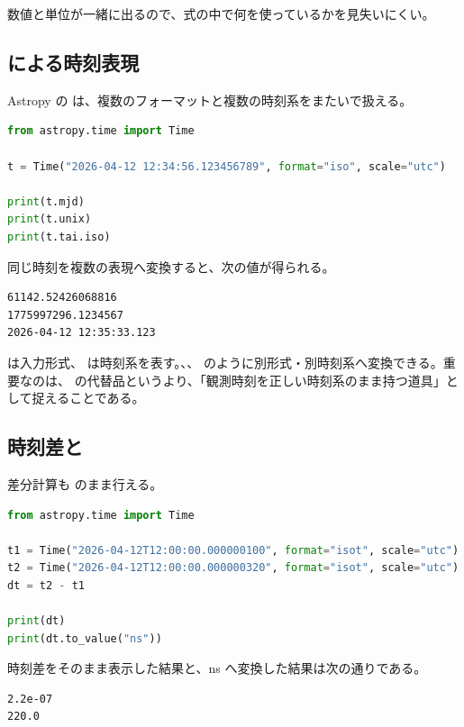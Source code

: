 数値と単位が一緒に出るので、式の中で何を使っているかを見失いにくい。

\subsection{ による時刻表現}

Astropy の  は、複数のフォーマットと複数の時刻系をまたいで扱える。

\begin{lstlisting}[language=Python]
from astropy.time import Time

t = Time("2026-04-12 12:34:56.123456789", format="iso", scale="utc")

print(t.mjd)
print(t.unix)
print(t.tai.iso)
\end{lstlisting}

同じ時刻を複数の表現へ変換すると、次の値が得られる。

\begin{lstlisting}[numbers=none, xleftmargin=2\zw]
61142.52426068816
1775997296.1234567
2026-04-12 12:35:33.123
\end{lstlisting}

 は入力形式、 は時刻系を表す。、、 のように別形式・別時刻系へ変換できる。重要なのは、 の代替品というより、「観測時刻を正しい時刻系のまま持つ道具」として捉えることである。

\subsection{時刻差と }

差分計算も  のまま行える。

\begin{lstlisting}[language=Python]
from astropy.time import Time

t1 = Time("2026-04-12T12:00:00.000000100", format="isot", scale="utc")
t2 = Time("2026-04-12T12:00:00.000000320", format="isot", scale="utc")
dt = t2 - t1

print(dt)
print(dt.to_value("ns"))
\end{lstlisting}

時刻差をそのまま表示した結果と、ns へ変換した結果は次の通りである。

\begin{lstlisting}[numbers=none, xleftmargin=2\zw]
2.2e-07
220.0
\end{lstlisting}

